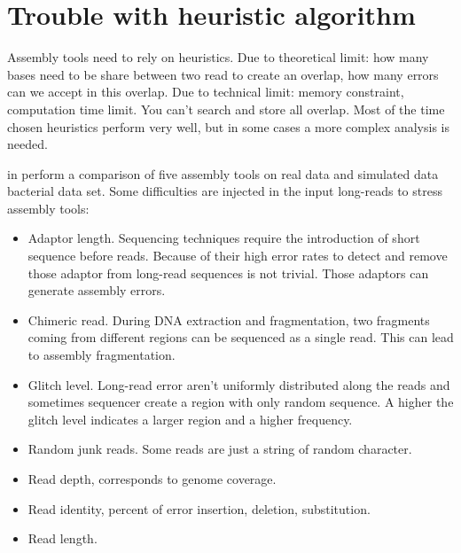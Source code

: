 \documentclass[main.tex]{subfiles}
\begin{document}


\section{Trouble with heuristic algorithm}

Assembly tools need to rely on heuristics. Due to theoretical limit: how many bases need to be share between two read to create an overlap, how many errors can we accept in this overlap. Due to technical limit: memory constraint, computation time limit. You can't search and store all overlap.
Most of the time chosen heuristics perform very well, but in some cases a more complex analysis is needed.

\citeauthor{long_read_assembler_comparison} in \cite{long_read_assembler_comparison} perform a comparison of five assembly tools on real data and simulated data bacterial data set. Some difficulties are injected in the input long-reads to stress assembly tools:
\begin{itemize}
    \item Adaptor length. Sequencing techniques require the introduction of short sequence before reads. Because of their high error rates to detect and remove those adaptor from long-read sequences is not trivial. Those adaptors can generate  assembly errors.
    \item Chimeric read. During DNA extraction and fragmentation, two fragments coming from different regions can be  sequenced as a single read. This can lead to assembly fragmentation.
    \item Glitch level. Long-read error aren't uniformly distributed along the reads and sometimes sequencer create a region with only random sequence. A higher the glitch level indicates a larger region and a higher frequency. 
    \item Random junk reads. Some reads are just a string of random character.
    \item Read depth, corresponds to genome coverage.
    \item Read identity, percent of error insertion, deletion, substitution. 
    \item Read length.
\end{itemize}
\end{document}
